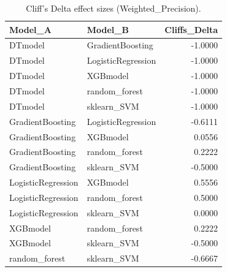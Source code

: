 \begin{table}[t]
\centering
\begin{tabular}{llr}
\toprule
Model_A & Model_B & Cliffs_Delta \\
\midrule
DTmodel & GradientBoosting & -1.0000 \\
DTmodel & LogisticRegression & -1.0000 \\
DTmodel & XGBmodel & -1.0000 \\
DTmodel & random_forest & -1.0000 \\
DTmodel & sklearn_SVM & -1.0000 \\
GradientBoosting & LogisticRegression & -0.6111 \\
GradientBoosting & XGBmodel & 0.0556 \\
GradientBoosting & random_forest & 0.2222 \\
GradientBoosting & sklearn_SVM & -0.5000 \\
LogisticRegression & XGBmodel & 0.5556 \\
LogisticRegression & random_forest & 0.5000 \\
LogisticRegression & sklearn_SVM & 0.0000 \\
XGBmodel & random_forest & 0.2222 \\
XGBmodel & sklearn_SVM & -0.5000 \\
random_forest & sklearn_SVM & -0.6667 \\
\bottomrule
\end{tabular}
\caption{Cliff's Delta effect sizes (Weighted_Precision).}
\label{tab:cliffs_Weighted_Precision}
\end{table}